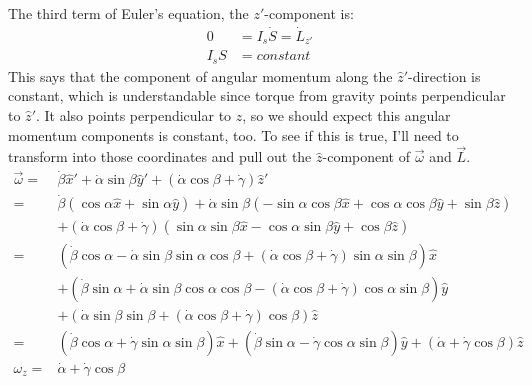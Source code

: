 \documentclass[10pt]{article}
\begin{document}
The third term of Euler's equation, the $z'$-component is:
\begin{align*}
    0 &= I_s\dot S = \dot{L}_{z'} \\
    I_sS &= constant
\end{align*}
This says that the component of angular momentum along the 
$\hat{z}'$-direction is constant, which is understandable since torque 
from gravity points perpendicular to $\hat{z}'$. It also points 
perpendicular to $\hat{z}$, so we should expect this angular 
momentum components is constant, too. To see if this is true, I'll 
need to transform into those coordinates and pull out the $\hat{z}$-component
 of $\vec{\omega}$ and $\vec{L}$.
\begin{align*}
    \vec\omega = &\dot\beta\hat{x}'+\dot\alpha\sin\beta\hat{y}'
        +(\dot\alpha\cos\beta+\dot\gamma)\hat{z}' \\
    = &\dot\beta(\cos\alpha\hat{x}+\sin\alpha\hat{y}) 
        +\dot\alpha\sin\beta(-\sin\alpha\cos\beta\hat{x}
        +\cos\alpha\cos\beta\hat{y} + \sin\beta\hat{z})\\
        &+(\dot\alpha\cos\beta+\dot\gamma)(\sin\alpha\sin\beta\hat{x} 
        -\cos\alpha\sin\beta\hat{y}+\cos\beta\hat{z}) \\
    = &\left(\dot\beta\cos\alpha
        -\dot\alpha\sin\beta\sin\alpha\cos\beta
        +(\dot\alpha\cos\beta+\dot\gamma)\sin\alpha\sin\beta\right)\hat{x} \\
        &+\left(\dot\beta\sin\alpha
        +\dot\alpha\sin\beta\cos\alpha\cos\beta
        -(\dot\alpha\cos\beta+\dot\gamma)\cos\alpha\sin\beta\right)\hat{y}\\
        &+\left(\dot\alpha\sin\beta\sin\beta
        +(\dot\alpha\cos\beta+\dot\gamma)\cos\beta\right)\hat{z} \\
    = &\left(\dot\beta\cos\alpha
        +\dot\gamma\sin\alpha\sin\beta\right)\hat{x} 
        +\left(\dot\beta\sin\alpha
        -\dot\gamma\cos\alpha\sin\beta\right)\hat{y}
        +\left(\dot\alpha+\dot\gamma\cos\beta\right)\hat{z} \\
    \omega_z = &\dot\alpha + \dot\gamma\cos\beta
\end{align*}
\end{document}
